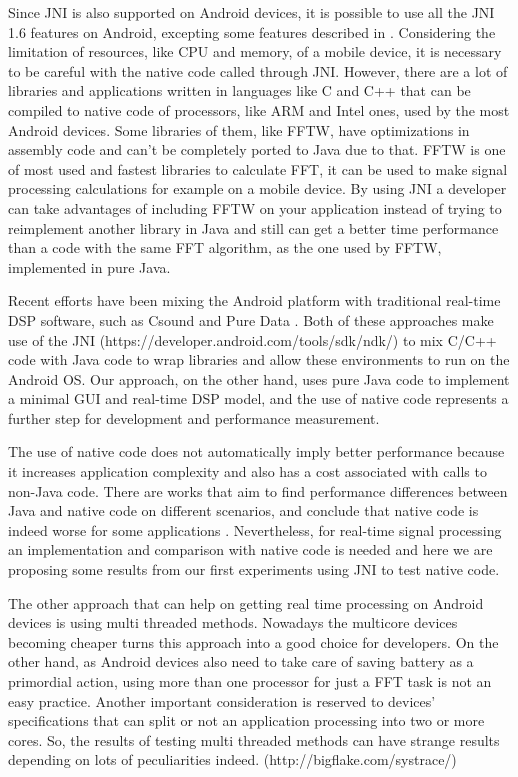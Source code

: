 \documentclass[12pt]{article}
\begin{document}
Since  JNI is also supported on Android devices, it is possible to use all the
JNI 1.6 features on Android, excepting some features described in
\cite{MakingMusicalApps}. Considering the limitation of resources, like CPU
and  memory, of a mobile device, it is necessary to be careful with the native
code called through JNI. However, there are a lot of libraries  and
applications written in languages like C and C++ that can be  compiled to
native code of processors, like ARM and Intel ones, used by  the most Android
devices. Some libraries of them, like FFTW, have  optimizations in assembly
code and can't be completely ported to Java due to that. FFTW is one of most
used and fastest libraries \citep{6118781} to calculate FFT, it can be used to
make signal processing calculations  for example on a mobile device. By using
JNI a developer can take  advantages of including FFTW on your application
instead of trying to  reimplement another library in Java and still can get a
better time  performance than a code with the same FFT algorithm, as the one
used by FFTW, implemented in pure Java.

Recent  efforts have been mixing the Android platform with traditional
real-time DSP software, such as Csound \citep{LazzaLAC} and Pure  Data
\citep{MakingMusicalApps}. Both of these approaches make use of the JNI
(https://developer.android.com/tools/sdk/ndk/)  to mix C/C++ code with Java
code to wrap libraries and allow these  environments to run on the Android OS.
Our approach, on the other hand,  uses pure Java code to implement a minimal
GUI and real-time DSP model,  and the use of native code represents a further
step for development and  performance measurement.

The  use of native code does not automatically imply better performance
because it increases application complexity and also has a cost  associated
with calls to non-Java code. There are works that aim to find  performance
differences between Java and native code on different  scenarios, and conclude
that native code is indeed worse for some  applications \citep{6118781}.
Nevertheless, for real-time signal processing  an implementation and
comparison with native code is needed and here we  are proposing some results
from our first experiments using JNI to test  native code.

The  other approach that can help on getting real time processing on Android
devices is using multi threaded methods. Nowadays the multicore devices
becoming cheaper turns this approach into a good choice for developers.  On
the other hand, as Android devices also need to take care of saving  battery
as a primordial action, using more than one processor for just a  FFT task is
not an easy practice. Another important consideration is  reserved to devices'
specifications that can split or not an application  processing into two or
more cores. So, the results of testing multi  threaded methods can have
strange results depending on lots of  peculiarities indeed.
(http://bigflake.com/systrace/)
\end{document}
